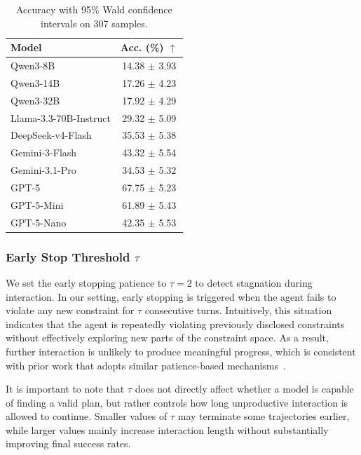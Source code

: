 \begin{table}
\vspace{-0.5em}
\centering
\small
\begin{tabular}{lc}
\toprule
Model & Acc. (\%) $\uparrow$ \\
\midrule
Qwen3-8B & 14.38 $\pm$ 3.93 \\
Qwen3-14B & 17.26 $\pm$ 4.23 \\
Qwen3-32B & 17.92 $\pm$ 4.29 \\
Llama-3.3-70B-Instruct & 29.32 $\pm$ 5.09 \\
DeepSeek-v4-Flash & 35.53 $\pm$ 5.38 \\
Gemini-3-Flash & 43.32 $\pm$ 5.54 \\
Gemini-3.1-Pro & 34.53 $\pm$ 5.32 \\
GPT-5 & 67.75 $\pm$ 5.23 \\
GPT-5-Mini & 61.89 $\pm$ 5.43 \\
GPT-5-Nano & 42.35 $\pm$ 5.53 \\
\bottomrule
\end{tabular}
\vspace{-0.5em}
\caption{Accuracy with 95\% Wald confidence intervals on 307 samples.}
\label{tab:model_acc_ci}
\vspace{-1em}
\end{table}

\subsubsection{Early Stop Threshold $\tau$}
\label{app:early-stop-threshold-ablation}

We set the early stopping patience to $\tau = 2$ to detect stagnation during interaction. 
In our setting, early stopping is triggered when the agent fails to violate any new constraint for $\tau$ consecutive turns. 
Intuitively, this situation indicates that the agent is repeatedly violating previously disclosed constraints without effectively exploring new parts of the constraint space. 
As a result, further interaction is unlikely to produce meaningful progress, which is consistent with prior work that adopts similar patience-based mechanisms~\citep{UserBench}.

It is important to note that $\tau$ does not directly affect whether a model is capable of finding a valid plan, but rather controls how long unproductive interaction is allowed to continue. 
Smaller values of $\tau$ may terminate some trajectories earlier, while larger values mainly increase interaction length without substantially improving final success rates.

